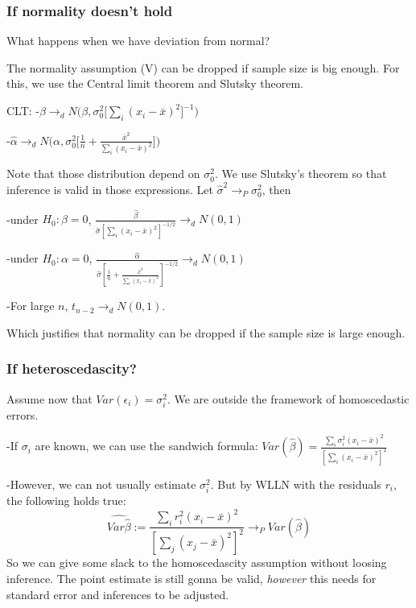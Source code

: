 \documentclass[
]{article}
\begin{document}
\hypertarget{if-normality-doesnt-hold}{%
\subsubsection{If normality doesn't
hold}\label{if-normality-doesnt-hold}}

What happens when we have deviation from normal?

The normality assumption (V) can be dropped if sample size is big
enough. For this, we use the Central limit theorem and Slutsky theorem.

CLT:
-\(\hat{\beta}\to_d N\big(\beta,\sigma_0^2\big[\sum_i (x_i-\bar{x})^2\big]^{-1}\big)\)

-\(\hat{\alpha}\to_d N\big(\alpha,\sigma_0^2\big[\frac{1}{n}+\frac{\bar{x}^2}{\sum_i (x_i-\bar{x})^2}\big]\big)\)

Note that those distribution depend on \(\sigma_0^2\). We use Slutsky's
theorem so that inference is valid in those expressions. Let
\(\hat{\sigma}^2\to_P\sigma_0^2\), then

-under \(H_0 :\beta=0\),
\(\frac{\hat{\beta}}{\hat{\sigma}[\sum_i (x_i-\bar{x})^2]^{-1/2}}\to_d N(0,1)\)

-under \(H_0 :\alpha=0\),
\(\frac{\hat{\alpha}}{\hat{\sigma}[\frac{1}{n}+\frac{\bar{x}^2}{\sum_i (x_i-\bar{x})^2}]^{-1/2}}\to_d N(0,1)\)

-For large \(n\), \(t_{n-2}\to_d N(0,1)\).

Which justifies that normality can be dropped if the sample size is
large enough.

\hypertarget{if-heteroscedascity}{%
\subsubsection{If heteroscedascity?}\label{if-heteroscedascity}}

Assume now that \(Var(\epsilon_i)=\sigma_i^2\). We are outside the
framework of homoscedastic errors.

-If \(\sigma_i\) are known, we can use the sandwich formula:
\(Var(\hat{\beta})=\frac{\sum_i\sigma_i^2 (x_i-\bar{x})^2}{[\sum_i (x_i-\bar{x})^2]^2}\)

-However, we can not usually estimate \(\sigma_i^2\). But by WLLN with
the residuals \(r_i\), the following holds true:
\[\widehat{Var{\hat{\beta}}}:=\frac{\sum_i r_i^2 (x_i-\bar{x})^2}{[\sum_j (x_j-\bar{x})^2]^2}\to_P Var(\hat{\beta})\]
So we can give some slack to the homoscedascity assumption without
loosing inference. The point estimate is still gonna be valid,
\emph{however} this needs for standard error and inferences to be
adjusted.
\end{document}
